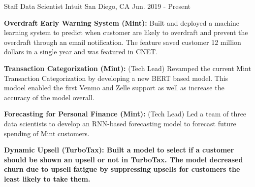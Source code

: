 


\begin{cventries}




\cventry
    {Staff Data Scientist} %
    {Intuit} %
    {San Diego, CA} %
    {Jun. 2019 - Present} %
    {\begin{cvitems}
        \setlength\itemsep{.15em}
        \item { \textbf{Overdraft Early Warning System (Mint): }Built and deployed a machine learning system to predict when customer are likely to overdraft and prevent the overdraft through an email notification. The feature saved customer 12 million dollars in a single year and was featured in CNET. }
        \item { \textbf{Transaction Categorization (Mint): } (Tech Lead) Revamped the current Mint Transaction Categorization by developing a new BERT based model. This modoel enabled the first Venmo and Zelle support as well as increase the accuracy of the model overall. }
         \item { \textbf{Forecasting for Personal Finance (Mint): } (Tech Lead) Led a team of three data scientists to develop an RNN-based forecasting model to forecast future spending of Mint customers.}
         \item { \textbf{Dynamic Upsell (TurboTax): Built a model to select if a customer should be shown an upsell or not in TurboTax. The model decreased churn due to upsell fatigue by suppressing upsells for customers the least likely to take them. }}
     \end{cvitems}}



\end{cventries}
